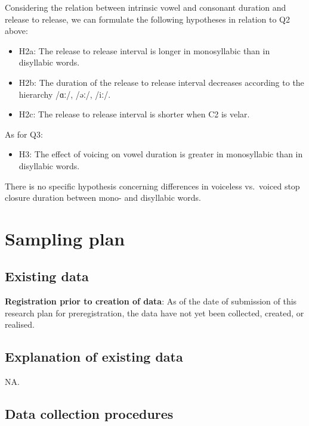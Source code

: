 \documentclass[11pt,]{article}
\providecommand{\tightlist}{%
  \setlength{\itemsep}{0pt}\setlength{\parskip}{0pt}}
\begin{document}
Considering the relation between intrinsic vowel and consonant duration
and release to release, we can formulate the following hypotheses in
relation to Q2 above:

\begin{itemize}
\tightlist
\item
  H2a: The release to release interval is longer in monosyllabic than in
  disyllabic words.
\item
  H2b: The duration of the release to release interval decreases
  according to the hierarchy /ɑː/, /əː/, /iː/.
\item
  H2c: The release to release interval is shorter when C2 is velar.
\end{itemize}

As for Q3:

\begin{itemize}
\tightlist
\item
  H3: The effect of voicing on vowel duration is greater in monosyllabic
  than in disyllabic words.
\end{itemize}

There is no specific hypothesis concerning differences in voiceless
vs.~voiced stop closure duration between mono- and disyllabic words.

\section{Sampling plan}\label{sampling-plan}

\subsection{Existing data}\label{existing-data}

\textbf{Registration prior to creation of data}: As of the date of
submission of this research plan for preregistration, the data have not
yet been collected, created, or realised.

\subsection{Explanation of existing
data}\label{explanation-of-existing-data}

NA.

\subsection{Data collection
procedures}\label{data-collection-procedures}
\end{document}

